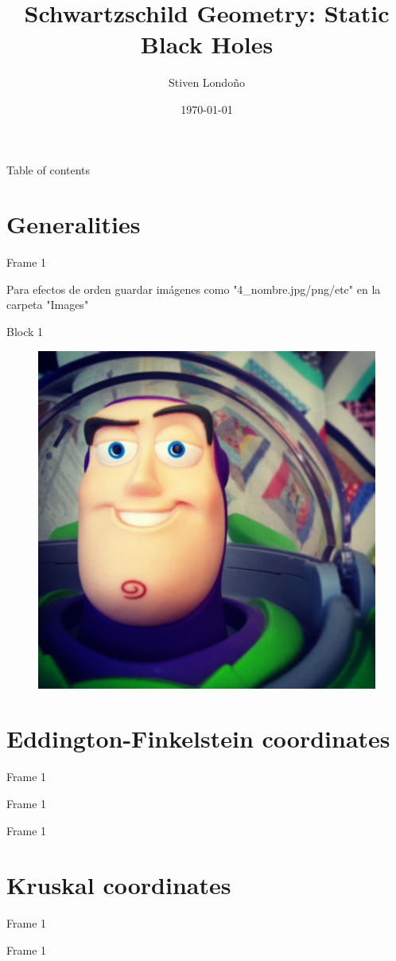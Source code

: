 \documentclass[xcolor=dvipsnames]{beamer}
\title[Schwartzschild geometry]{Schwartzschild Geometry: Static Black Holes}
\date{\today}
\author[Universidad del Valle]{Stiven Londoño}
\institute[]{Universidad del Valle \\ Departamento de física}
\begin{document}
	
	\begin{frame}
		\titlepage
	\end{frame}
	
	\begin{frame}{Table of contents}
    \tableofcontents
	\end{frame}
	
	
\section{Generalities}

\begin{frame}{Frame 1}

Para efectos de orden guardar imágenes como "4\_nombre.jpg/png/etc" en la carpeta "Images"

\begin{block}{Block 1}
\cite{hobson_efstathiou_lasenby_2006}    
\end{block}

\begin{figure}
    \centering
    \includegraphics[width=0.25 \textwidth]{Presentations/Images/sample.jpg}
\end{figure}
    
\end{frame}

\section{Eddington-Finkelstein coordinates}
\begin{frame}{Frame 1}

\end{frame}

\begin{frame}{Frame 1}

\end{frame}




\begin{frame}{Frame 1}

\end{frame}
\section{Kruskal coordinates}


\begin{frame}{Frame 1}

\end{frame}



\begin{frame}{Frame 1}

\end{frame}
\end{document}
